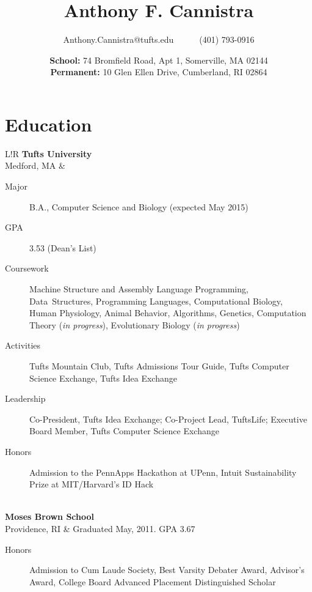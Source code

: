\documentclass[10pt, letter]{article}
\title{\vspace{-80pt}\bfseries Anthony F. Cannistra\vspace{-10pt}}
\author{Anthony.Cannistra@tufts.edu~~~~~~(401) 793-0916}
\date{\vspace{-6pt}\small{
\textbf{School:} 74 Bromfield Road, Apt 1, Somerville, MA 02144\\
\textbf{Permanent:} 10 Glen Ellen Drive, Cumberland, RI 02864
\vspace{-20pt}
}
}
\newcommand\VRule{\color{lightgray}\vrule width 0.5pt}
\begin{document}
\maketitle
\thispagestyle{empty}\section*{Education}
\begin{tabular}{L!{\VRule}R}
\textbf{Tufts University} \\ Medford, MA &
\vspace{-16.7pt}
\begin{description}
\item[Major] B.A., Computer Science and Biology (expected May 2015)
\item[GPA] 3.53 (Dean's List)
\item[Coursework] Machine Structure and Assembly Language Programming, Data~Structures, Programming Languages, Computational Biology, Human Physiology, Animal Behavior, Algorithms, Genetics, Computation Theory ({\em in progress}), Evolutionary Biology ({\em in progress})
\item[Activities] Tufts Mountain Club, Tufts Admissions Tour Guide, Tufts Computer Science Exchange, Tufts Idea Exchange
\item[Leadership] Co-President, Tufts Idea Exchange; Co-Project Lead, TuftsLife; Executive Board Member, Tufts Computer Science Exchange
\item[Honors] Admission to the PennApps Hackathon at UPenn, Intuit Sustainability Prize at MIT/Harvard's ID Hack
\end{description} \\
\textbf{Moses Brown School} \\ Providence, RI &
Graduated May, 2011. GPA 3.67
\begin{description}
\item[Honors] Admission to Cum Laude Society, Best Varsity Debater Award, Advisor's Award, College Board Advanced Placement Distinguished Scholar
\end{description}
\end{tabular}
\vspace{-15pt}
\end{document}
